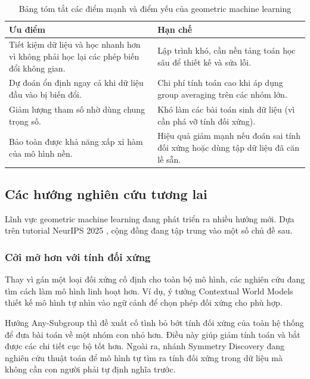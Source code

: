 \begin{table}[H]
    \centering
    \renewcommand{\arraystretch}{1.3}
    \begin{tabularx}{\textwidth}{|L|L|}
        \hline
        \textbf{Ưu điểm} & \textbf{Hạn chế} \\
        \hline
        Tiết kiệm dữ liệu và học nhanh hơn vì không phải học lại các phép biến đổi không gian. & Lập trình khó, cần nền tảng toán học sâu để thiết kế và sửa lỗi. \\
        \hline
        Dự đoán ổn định ngay cả khi dữ liệu đầu vào bị biến đổi. & Chi phí tính toán cao khi áp dụng group averaging trên các nhóm lớn. \\
        \hline
        Giảm lượng tham số nhờ dùng chung trọng số. & Khó làm các bài toán sinh dữ liệu (vì cần phá vỡ tính đối xứng). \\
        \hline
        Bảo toàn được khả năng xấp xỉ hàm của mô hình nền. & Hiệu quả giảm mạnh nếu đoán sai tính đối xứng hoặc dùng tập dữ liệu đã căn lề sẵn. \\
        \hline
    \end{tabularx}
    \caption[Tóm tắt ưu nhược điểm của geometric machine learning]{Bảng tóm tắt các điểm mạnh và điểm yếu của geometric machine learning}
    \label{tab:uu-nhuoc-diem}
\end{table}

\subsection{Các hướng nghiên cứu tương lai}
\label{subsec:huong-nghien-cuu}

Lĩnh vực geometric machine learning đang phát triển ra nhiều hướng mới. Dựa trên tutorial NeurIPS 2025 \cite{jegelka2025tutorial}, cộng đồng đang tập trung vào một số chủ đề sau.

\subsubsection{Cởi mở hơn với tính đối xứng}

Thay vì gán một loại đối xứng cố định cho toàn bộ mô hình, các nghiên cứu đang tìm cách làm mô hình linh hoạt hơn. Ví dụ, ý tưởng Contextual World Models \cite{gupta2024contextual} thiết kế mô hình tự nhìn vào ngữ cảnh để chọn phép đối xứng cho phù hợp. 

Hướng Any-Subgroup \cite{goel2025anysubgroup} thì đề xuất cố tình bỏ bớt tính đối xứng của toàn hệ thống để đưa bài toán về một nhóm con nhỏ hơn. Điều này giúp giảm tính toán và bắt được các chi tiết cục bộ tốt hơn. Ngoài ra, nhánh Symmetry Discovery đang nghiên cứu thuật toán để mô hình tự tìm ra tính đối xứng trong dữ liệu mà không cần con người phải tự định nghĩa trước.

